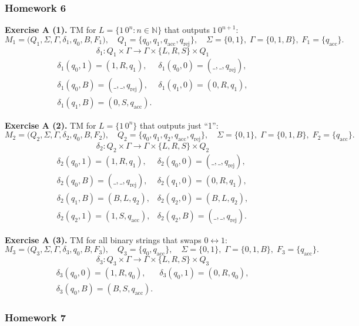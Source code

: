\documentclass{article}
\theoremstyle{theorem}
\theoremstyle{definition}
\theoremstyle{remark}
\begin{document}
\subsubsection*{Homework 6}

\noindent\textbf{Exercise A (1).} TM for \(L=\{1\,0^n : n\in\mathbb{N}\}\) that outputs \(1\,0^{n+1}\):
\[
M_1 = \bigl(Q_1,\Sigma,\Gamma,\delta_1,q_0,B,F_1\bigr),
\quad
Q_1=\{q_0,q_1,q_{\mathrm{acc}},q_{\mathrm{rej}}\},
\quad
\Sigma=\{0,1\},\;\Gamma=\{0,1,B\},\;
F_1=\{q_{\mathrm{acc}}\}.
\]
\[
\delta_1\colon Q_1\times\Gamma\to\Gamma\times\{L,R,S\}\times Q_1
\]
\[
\begin{array}{rl}
\delta_1(q_0,1)=(1,R,q_1), & \delta_1(q_0,0)=(\_,\_,q_{\mathrm{rej}}),\\
\delta_1(q_0,B)=(\_,\_,q_{\mathrm{rej}}), &
\delta_1(q_1,0)=(0,R,q_1),\\
\delta_1(q_1,B)=(0,S,q_{\mathrm{acc}}).
\end{array}
\]

\medskip
\noindent\textbf{Exercise A (2).} TM for \(L=\{1\,0^n\}\) that outputs just “1”:
\[
M_2 = \bigl(Q_2,\Sigma,\Gamma,\delta_2,q_0,B,F_2\bigr),
\quad
Q_2=\{q_0,q_1,q_2,q_{\mathrm{acc}},q_{\mathrm{rej}}\},
\quad
\Sigma=\{0,1\},\;\Gamma=\{0,1,B\},\;
F_2=\{q_{\mathrm{acc}}\}.
\]
\[
\delta_2\colon Q_2\times\Gamma\to\Gamma\times\{L,R,S\}\times Q_2
\]
\[
\begin{array}{rl}
\delta_2(q_0,1)=(1,R,q_1), & \delta_2(q_0,0)=(\_,\_,q_{\mathrm{rej}}),\\
\delta_2(q_0,B)=(\_,\_,q_{\mathrm{rej}}), &
\delta_2(q_1,0)=(0,R,q_1),\\
\delta_2(q_1,B)=(B,L,q_2), &
\delta_2(q_2,0)=(B,L,q_2),\\
\delta_2(q_2,1)=(1,S,q_{\mathrm{acc}}), &
\delta_2(q_2,B)=(\_,\_,q_{\mathrm{rej}}).
\end{array}
\]

\medskip
\noindent\textbf{Exercise A (3).} TM for all binary strings that swaps \(0\leftrightarrow1\):
\[
M_3 = \bigl(Q_3,\Sigma,\Gamma,\delta_3,q_0,B,F_3\bigr),
\quad
Q_3=\{q_0,q_{\mathrm{acc}}\},
\quad
\Sigma=\{0,1\},\;\Gamma=\{0,1,B\},\;
F_3=\{q_{\mathrm{acc}}\}.
\]
\[
\delta_3\colon Q_3\times\Gamma\to\Gamma\times\{L,R,S\}\times Q_3
\]
\[
\begin{array}{rl}
\delta_3(q_0,0)=(1,R,q_0), & \delta_3(q_0,1)=(0,R,q_0),\\
\delta_3(q_0,B)=(B,S,q_{\mathrm{acc}}).
\end{array}
\]

\subsubsection*{Homework 7}
\end{document}
